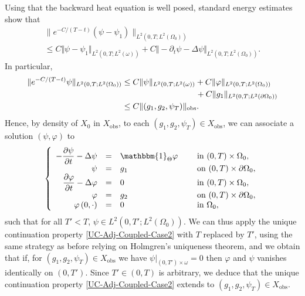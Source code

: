 \documentclass[10pt,a4paper]{amsart}
\newcommand{\obs}{\mathrm{obs}}
\newcommand{\norm}[1]{\Vert#1\Vert}
\theoremstyle{definition}
\begin{document}
Using that the backward heat equation is well posed, standard energy estimates show that
\begin{multline*}
\| e^{-C/(T-t)} (\psi - \psi_1) \|_{L^2(0,T; L^2(\Omega_0))}\\
\leq
C \norm{\psi- \psi_1}_{L^2(0,T; L^2(\omega))}
+
{C\norm{ - \partial_t \psi - \Delta \psi }_{L^2(0,T; L^2(\Omega_0))}}.
\end{multline*}
In particular,
\begin{align*}
\| e^{-C/(T-t)} \psi \|_{L^2(0,T; L^2(\Omega_0))}
& \leq
C \norm{\psi}_{L^2(0,T; L^2(\omega))}
+
{C\norm{ \varphi }_{L^2(0,T; L^2(\Omega_0))}}\\
&\hspace*{3.17cm}+
C \norm{g_1}_{L^2(0,T; L^2(\partial \Omega_0))}
\\
&\leq
C \norm{(g_1, g_2, \psi_T)}_{\obs}.
\end{align*}
Hence, by density of $X_0$ in $X_{\obs}$, to each $(g_1, g_2, \psi_T) \in X_{\obs}$, we can associate a solution $(\psi, \varphi)$ to
\begin{equation*}
\left\{
\begin{array}{rcll}
- \dfrac{\partial \psi}{\partial t}-\Delta \psi &=&\mathbbm{1}_{\Theta}\varphi \quad&\text{ in }(0,T) \times \Omega_0,
\\
\psi &=& g_1 &\text{ on }(0,T) \times \partial \Omega_0,
\\
\dfrac{\partial \varphi}{\partial t}-\Delta \varphi &=& 0 &\text{ in }(0,T) \times \Omega_0,
\\
\varphi &=& g_2 &\text{ on }(0,T) \times \partial \Omega_0,
\\
\varphi\left(0,\cdot\right) &=&0 &\text{ in }\Omega_0,
\end{array}
\right.
\end{equation*}
such that for all $T' < T$, $\psi \in L^2(0,T'; L^2(\Omega_0))$. We can thus apply the unique con\-ti\-nuation property \eqref{UC-Adj-Coupled-Case2} with $T$ replaced by $T'$, using the same strategy as before relying on Holmgren's uniqueness theorem, and we obtain that if, for $(g_1, g_2, \psi_T) \in X_{\obs}$ we have $\psi|_{(0,T') \times \omega} = 0$ then $\varphi$ and $\psi$ vanishes identically on $(0,T')$. Since $T' \in (0,T)$ is arbitrary, we deduce that the unique continuation property \eqref{UC-Adj-Coupled-Case2} extends to $(g_1, g_2, \psi_T) \in X_{\obs}$.
\end{document}
